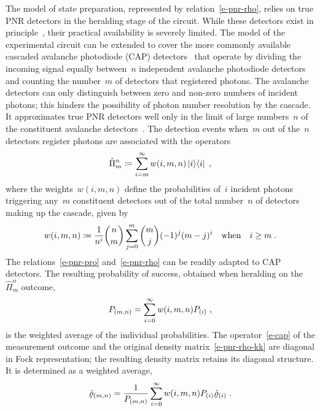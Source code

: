 \documentclass{article}
\begin{document}
The model of state preparation, represented by relation~\eqref{e-pnr-rho}, relies on true PNR detectors in the heralding stage of the circuit. While these detectors exist in principle~\cite{hopker2019,endo2021,endo2025a}, their practical availability is severely limited. The model of the experimental circuit can be extended to cover the more commonly available cascaded avalanche photodiode (CAP) detectors~\cite{hlousek2019,grygar2022,hlousek2024,ercolano2024} that operate by dividing the incoming signal equally between~$n$ independent avalanche photodiode detectors and counting the number~$m$ of detectors that registered photons. The avalanche detectors can only distinguish between zero and non-zero numbers of incident photons; this hinders the possibility of photon number resolution by the cascade. It approximates true PNR detectors well only in the limit of large numbers~$n$ of the constituent avalanche detectors~\cite{provaznik2020}. The detection events when~$m$ out of the~$n$ detectors register photons are associated with the operators~\cite{paul1996}
%
\begin{equation}\label{e-cap}
  \hat{\Pi}_{m}^{n} 
    \coloneqq \sum_{i = m}^{\infty} w(i, m, n) \ketbra{i}{i} \Qc
\end{equation}
%
where the weights~$w(i, m, n)$ define the probabilities of~$i$ incident photons triggering any~$m$ constituent detectors out of the total number~$n$ of detectors making up the cascade, given by
%
\begin{equation}\label{e-cap-w}
  w(i, m, n) \coloneqq 
    \frac{1}{n^{i}} \binom{n}{m} \sum_{j = 0}^{m} \binom{m}{j} (-1)^{j} (m - j)^{i} 
    \quad\text{when}\quad i \geq m \;\text{.}
\end{equation} 
%
The relations~\eqref{e-pnr-pro} and~\eqref{e-pnr-rho} can be readily adapted to CAP detectors. The resulting probability of success, obtained when heralding on the~$\hat{\Pi}_{m}^{n}$ outcome, 
%
\begin{equation}\label{e-cap-pro}
  P_{(m, n)} = \sum_{i = 0}^{\infty} w(i, m, n) P_{(i)} \;\text{,}
\end{equation}
%
is the weighted average of the individual probabilities. The operator~\eqref{e-cap} of the measurement outcome and the original density matrix~\eqref{e-pnr-rho-kk} are diagonal in Fock representation; the resulting density matrix retains its diagonal structure. It is determined as a weighted average,
%
\begin{equation}\label{e-cap-rho-kk}
  \hat{\varrho}_{(m, n)} =
    \frac{1}{ P_{(m,n)} }
    \sum_{i = 0}^{\infty} w(i, m, n) P_{(i)} \hat{\varrho}_{(i)}
  \;\text{.}
\end{equation}
\end{document}
